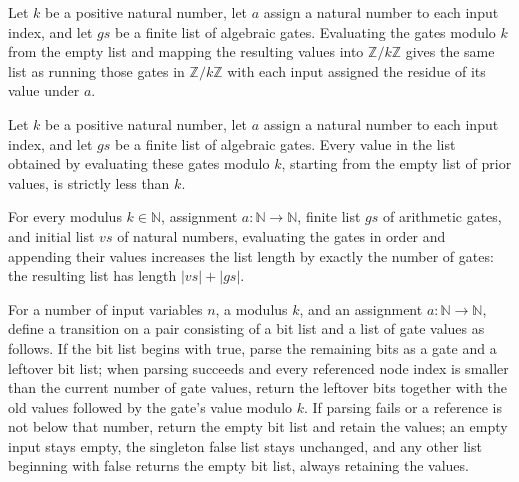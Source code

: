 \begin{theorem}
\label{Randomized.PIT.natCast_evalVals}
\leanok
{}
Let $k$ be a positive natural number, let $a$ assign a natural number to each input
index, and let $gs$ be a finite list of algebraic gates. Evaluating the gates modulo $k$
from the empty list and mapping the resulting values into $\mathbb Z/k\mathbb Z$ gives
the same list as running those gates in $\mathbb Z/k\mathbb Z$ with each input assigned
the residue of its value under $a$.
\end{theorem}

\begin{theorem}
\label{Randomized.PIT.lt_of_mem_evalVals}
\leanok
{}
Let $k$ be a positive natural number, let $a$ assign a natural number to each input
index, and let $gs$ be a finite list of algebraic gates. Every value in the list
obtained by evaluating these gates modulo $k$, starting from the empty list of prior
values, is strictly less than $k$.
\end{theorem}

\begin{theorem}
\label{Randomized.PIT.length_evalVals}
\leanok
{}
For every modulus $k\in\mathbb{N}$, assignment $a:\mathbb{N}\to\mathbb{N}$, finite list
$gs$ of arithmetic gates, and initial list $vs$ of natural numbers, evaluating the gates
in order and appending their values increases the list length by exactly the number of
gates: the resulting list has length $|vs|+|gs|$.
\end{theorem}

\begin{definition}
\label{Randomized.PIT.absStep}
\leanok
{}
For a number of input variables $n$, a modulus $k$, and an assignment
$a:\mathbb{N}\to\mathbb{N}$, define a transition on a pair consisting of a bit list and
a list of gate values as follows. If the bit list begins with true, parse the remaining
bits as a gate and a leftover bit list; when parsing succeeds and every referenced node
index is smaller than the current number of gate values, return the leftover bits
together with the old values followed by the gate’s value modulo $k$. If parsing fails
or a reference is not below that number, return the empty bit list and retain the
values; an empty input stays empty, the singleton false list stays unchanged, and any
other list beginning with false returns the empty bit list, always retaining the values.
\end{definition}

